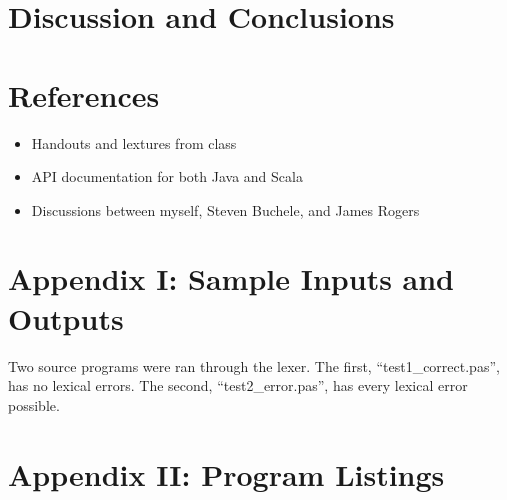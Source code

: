 \documentclass[paper=letter, fontsize=11pt, oneside, titlepage]{scrartcl}
\newcommand{\datalisting}[2][]{
    
}
\newcommand{\filelisting}[2][]{
    
}
\begin{document}
\section{Discussion and Conclusions}\label{conclusions}



\section{References}\label{ref}

\begin{itemize}
    \item Handouts and lextures from class
    \item API documentation for both Java and Scala
    \item Discussions between myself, Steven Buchele, and James Rogers
\end{itemize}

\section{Appendix I: Sample Inputs and Outputs}\label{sample}

Two source programs were ran through the lexer. The first, ``test1\_correct.pas'', has no lexical errors.  The second, ``test2\_error.pas'', has every lexical error possible.

\filelisting[language=pascal]{test1_correct.pas}
\filelisting{test1_correct.pas.listing}
\filelisting{test1_correct.pas.tokens}
\filelisting[language=pascal]{test2_errors.pas}
\filelisting{test2_errors.pas.listing}
\filelisting{test2_errors.pas.tokens}

\section{Appendix II: Program Listings}\label{code}

\datalisting{operators.dat}
\datalisting{punctuation.dat}
\datalisting{reservedwords.dat}
\end{document}
